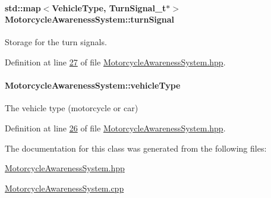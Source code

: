 \hypertarget{classMotorcycleAwarenessSystem_a43fde090639a3a58fc5bbf8bafc966f7}{
\paragraph[{turn\-Signal}]{\setlength{\rightskip}{0pt plus 5cm}std\-::map$<${\bf Vehicle\-Type}, {\bf Turn\-Signal\-\_\-t}$\ast$$>$ Motorcycle\-Awareness\-System\-::turn\-Signal\hspace{0.3cm}{\ttfamily [private]}}}\label{classMotorcycleAwarenessSystem_a43fde090639a3a58fc5bbf8bafc966f7}


Storage for the turn signals. 



Definition at line \hyperlink{MotorcycleAwarenessSystem_8hpp_source_l00027}{27} of file \hyperlink{MotorcycleAwarenessSystem_8hpp_source}{Motorcycle\-Awareness\-System.\-hpp}.

\hypertarget{classMotorcycleAwarenessSystem_a977b2085bfbf6a62902bf2d80160e6d2}{
\paragraph[{vehicle\-Type}]{ Motorcycle\-Awareness\-System\-::vehicle\-Type\hspace{0.3cm}{\ttfamily [private]}}}\label{classMotorcycleAwarenessSystem_a977b2085bfbf6a62902bf2d80160e6d2}


The vehicle type (motorcycle or car) 



Definition at line \hyperlink{MotorcycleAwarenessSystem_8hpp_source_l00026}{26} of file \hyperlink{MotorcycleAwarenessSystem_8hpp_source}{Motorcycle\-Awareness\-System.\-hpp}.



The documentation for this class was generated from the following files\-:\begin{DoxyCompactItemize}
\item 
\hyperlink{MotorcycleAwarenessSystem_8hpp}{Motorcycle\-Awareness\-System.\-hpp}\item 
\hyperlink{MotorcycleAwarenessSystem_8cpp}{Motorcycle\-Awareness\-System.\-cpp}\end{DoxyCompactItemize}
